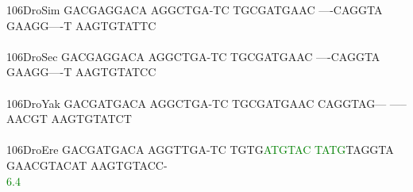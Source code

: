 \documentclass[11pt,twoside,reqno,a4paper]{article}
\begin{document}
{106\hspace*{2\charwidth}DroSim	GACGAGGACA	AGGCTGA-TC	TGCGATGAAC	----CAGGTA	GAAGG----T	AAGTGTATTC	\\
\hspace*{5\charwidth}\hspace*{7\charwidth}\hspace*{1\charwidth}\hspace*{1\charwidth}\hspace*{1\charwidth}\hspace*{1\charwidth}\hspace*{1\charwidth}\hspace*{1\charwidth}\\
106\hspace*{2\charwidth}DroSec	GACGAGGACA	AGGCTGA-TC	TGCGATGAAC	----CAGGTA	GAAGG----T	AAGTGTATCC	\\
\hspace*{5\charwidth}\hspace*{7\charwidth}\hspace*{1\charwidth}\hspace*{1\charwidth}\hspace*{1\charwidth}\hspace*{1\charwidth}\hspace*{1\charwidth}\hspace*{1\charwidth}\\
106\hspace*{2\charwidth}DroYak	GACGATGACA	AGGCTGA-TC	TGCGATGAAC	CAGGTAG---	-----AACGT	AAGTGTATCT	\\
\hspace*{5\charwidth}\hspace*{7\charwidth}\hspace*{1\charwidth}\hspace*{1\charwidth}\hspace*{1\charwidth}\hspace*{1\charwidth}\hspace*{1\charwidth}\hspace*{1\charwidth}\\
106\hspace*{2\charwidth}DroEre	GACGATGACA	AGGTTGA-TC	TGTG\textcolor{Green}{A}\textcolor{Green}{T}\textcolor{Green}{G}\textcolor{Green}{T}\textcolor{Green}{A}\textcolor{Green}{C}	\textcolor{Green}{T}\textcolor{Green}{A}\textcolor{Green}{T}\textcolor{Green}{G}TAGGTA	GAACGTACAT	AAGTGTACC-	\\
\hspace*{5\charwidth}\hspace*{7\charwidth}\hspace*{1\charwidth}\hspace*{1\charwidth}\hspace*{24\charwidth}\textcolor{Green}{6.4}\hspace*{1\charwidth}\hspace*{1\charwidth}\hspace*{1\charwidth}\hspace*{1\charwidth}\\
}
\end{document}

